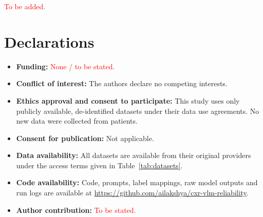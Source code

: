 \documentclass[pdflatex,sn-mathphys-num]{sn-jnl}
\newcommand{\tbd}[1][TBD]{\textcolor{red}{#1}}   %
\theoremstyle{thmstyleone}
\begin{document}
\backmatter

\tbd[To be added.]

\section*{Declarations}

\begin{itemize}
\item \textbf{Funding:} \tbd[None / to be stated.]
\item \textbf{Conflict of interest:} The authors declare no competing interests.
\item \textbf{Ethics approval and consent to participate:} This study uses only publicly available, de-identified datasets under their data use agreements. No new data were collected from patients.
\item \textbf{Consent for publication:} Not applicable.
\item \textbf{Data availability:} All datasets are available from their original providers under the access terms given in Table~\ref{tab:datasets}.
\item \textbf{Code availability:} Code, prompts, label mappings, raw model outputs and run logs are available at \url{https://github.com/ailakshya/cxr-vlm-reliability}.
\item \textbf{Author contribution:} \tbd[To be stated.]
\end{itemize}
\end{document}
